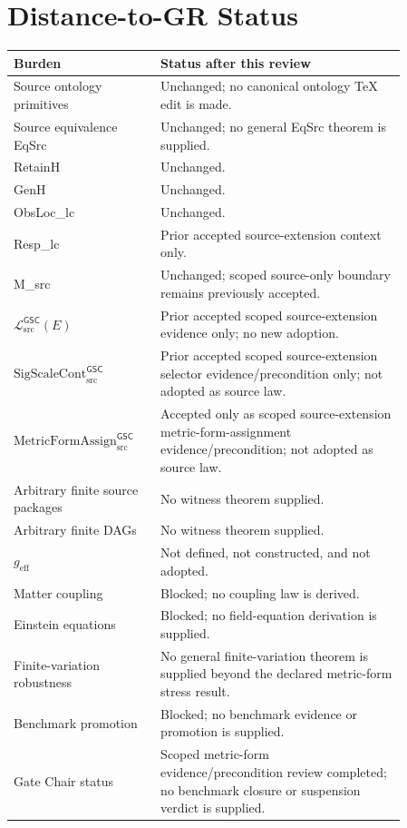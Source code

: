 \documentclass[11pt]{article}
\newcommand{\MetricData}{\mathcal{L}_{\mathrm{src}}^{\mathsf{GSC}}}
\newcommand{\geff}{g_{\mathrm{eff}}}
\newcommand{\SigScaleCont}{\mathrm{SigScaleCont}_{\mathrm{src}}^{\mathsf{GSC}}}
\newcommand{\MetricFormAssign}{\mathrm{MetricFormAssign}_{\mathrm{src}}^{\mathsf{GSC}}}
\begin{document}
\section{Distance-to-GR Status}

\begin{longtable}{p{0.30\linewidth}p{0.56\linewidth}}
\toprule
Burden & Status after this review \\
\midrule
Source ontology primitives & Unchanged; no canonical ontology TeX edit is made. \\
Source equivalence EqSrc & Unchanged; no general EqSrc theorem is supplied. \\
RetainH & Unchanged. \\
GenH & Unchanged. \\
ObsLoc\_lc & Unchanged. \\
Resp\_lc & Prior accepted source-extension context only. \\
M\_src & Unchanged; scoped source-only boundary remains previously accepted. \\
\(\MetricData(E)\) & Prior accepted scoped source-extension evidence only; no new adoption. \\
\(\SigScaleCont\) & Prior accepted scoped source-extension selector evidence/precondition only; not adopted as source law. \\
\(\MetricFormAssign\) & Accepted only as scoped source-extension metric-form-assignment evidence/precondition; not adopted as source law. \\
Arbitrary finite source packages & No witness theorem supplied. \\
Arbitrary finite DAGs & No witness theorem supplied. \\
\(\geff\) & Not defined, not constructed, and not adopted. \\
Matter coupling & Blocked; no coupling law is derived. \\
Einstein equations & Blocked; no field-equation derivation is supplied. \\
Finite-variation robustness & No general finite-variation theorem is supplied beyond the declared metric-form stress result. \\
Benchmark promotion & Blocked; no benchmark evidence or promotion is supplied. \\
Gate Chair status & Scoped metric-form evidence/precondition review completed; no benchmark closure or suspension verdict is supplied. \\
\bottomrule
\end{longtable}
\end{document}
